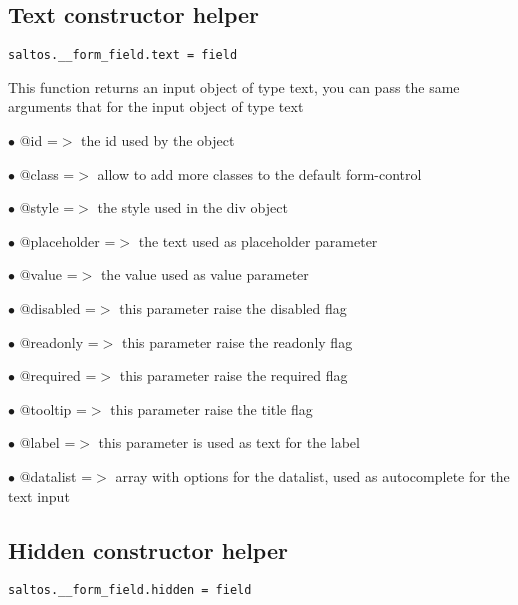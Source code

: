 \documentclass[a4paper]{book}
\begin{document}
\hypertarget{toc374}{}
\subsection{Text constructor helper}

\begin{lstlisting}
saltos.__form_field.text = field
\end{lstlisting}

This function returns an input object of type text, you can pass the same arguments
that for the input object of type text

\begin{compactitem}
\item[\color{myblue}$\bullet$] @id          =$>$ the id used by the object
\item[\color{myblue}$\bullet$] @class       =$>$ allow to add more classes to the default form-control
\item[\color{myblue}$\bullet$] @style       =$>$ the style used in the div object
\item[\color{myblue}$\bullet$] @placeholder =$>$ the text used as placeholder parameter
\item[\color{myblue}$\bullet$] @value       =$>$ the value used as value parameter
\item[\color{myblue}$\bullet$] @disabled    =$>$ this parameter raise the disabled flag
\item[\color{myblue}$\bullet$] @readonly    =$>$ this parameter raise the readonly flag
\item[\color{myblue}$\bullet$] @required    =$>$ this parameter raise the required flag
\item[\color{myblue}$\bullet$] @tooltip     =$>$ this parameter raise the title flag
\item[\color{myblue}$\bullet$] @label       =$>$ this parameter is used as text for the label
\item[\color{myblue}$\bullet$] @datalist    =$>$ array with options for the datalist, used as autocomplete for the text input
\end{compactitem}

\hypertarget{toc375}{}
\subsection{Hidden constructor helper}

\begin{lstlisting}
saltos.__form_field.hidden = field
\end{lstlisting}
\end{document}
